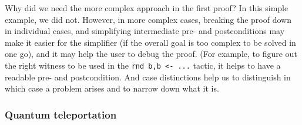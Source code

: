 \documentclass{article}
\begin{document}
Why did we need the more complex approach in the first proof? In this
simple example, we did not. However, in more complex cases, breaking
the proof down in individual cases, and simplifying intermediate
pre- and postconditions may make it easier for the simplifier (if the overall goal
is too complex to be solved in one go), and it may help the user to debug
the proof. (For example, to figure out the right witness to be used in
the \texttt{rnd b,b <- ...} tactic, it helps to have a readable pre- and
postcondition. And case distinctions help us to distinguish in which
case a problem arises and to narrow down what it is.





\subsubsection{Quantum teleportation}
\end{document}
